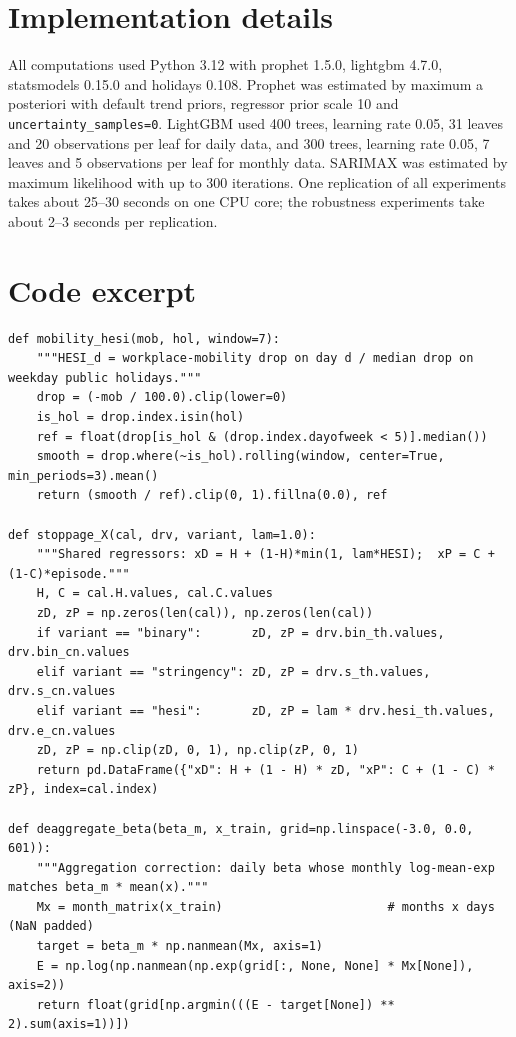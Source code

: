 \documentclass{article}
\theoremstyle{plain}
\theoremstyle{definition}
\theoremstyle{remark}
\begin{document}
\section{Implementation details}\label{app:impl}
All computations used Python 3.12 with prophet 1.5.0, lightgbm 4.7.0, statsmodels 0.15.0 \citep{seabold2010statsmodels} and holidays 0.108. Prophet was estimated by maximum a posteriori with default trend priors, regressor prior scale 10 and \texttt{uncertainty\_samples=0}. LightGBM used 400 trees, learning rate 0.05, 31 leaves and 20 observations per leaf for daily data, and 300 trees, learning rate 0.05, 7 leaves and 5 observations per leaf for monthly data. SARIMAX was estimated by maximum likelihood with up to 300 iterations. One replication of all experiments takes about 25--30 seconds on one CPU core; the robustness experiments take about 2--3 seconds per replication.

\section{Code excerpt}\label{app:code}
\begin{lstlisting}
def mobility_hesi(mob, hol, window=7):
    """HESI_d = workplace-mobility drop on day d / median drop on weekday public holidays."""
    drop = (-mob / 100.0).clip(lower=0)
    is_hol = drop.index.isin(hol)
    ref = float(drop[is_hol & (drop.index.dayofweek < 5)].median())
    smooth = drop.where(~is_hol).rolling(window, center=True, min_periods=3).mean()
    return (smooth / ref).clip(0, 1).fillna(0.0), ref

def stoppage_X(cal, drv, variant, lam=1.0):
    """Shared regressors: xD = H + (1-H)*min(1, lam*HESI);  xP = C + (1-C)*episode."""
    H, C = cal.H.values, cal.C.values
    zD, zP = np.zeros(len(cal)), np.zeros(len(cal))
    if variant == "binary":       zD, zP = drv.bin_th.values, drv.bin_cn.values
    elif variant == "stringency": zD, zP = drv.s_th.values, drv.s_cn.values
    elif variant == "hesi":       zD, zP = lam * drv.hesi_th.values, drv.e_cn.values
    zD, zP = np.clip(zD, 0, 1), np.clip(zP, 0, 1)
    return pd.DataFrame({"xD": H + (1 - H) * zD, "xP": C + (1 - C) * zP}, index=cal.index)

def deaggregate_beta(beta_m, x_train, grid=np.linspace(-3.0, 0.0, 601)):
    """Aggregation correction: daily beta whose monthly log-mean-exp matches beta_m * mean(x)."""
    Mx = month_matrix(x_train)                       # months x days (NaN padded)
    target = beta_m * np.nanmean(Mx, axis=1)
    E = np.log(np.nanmean(np.exp(grid[:, None, None] * Mx[None]), axis=2))
    return float(grid[np.argmin(((E - target[None]) ** 2).sum(axis=1))])
\end{lstlisting}
\end{document}
